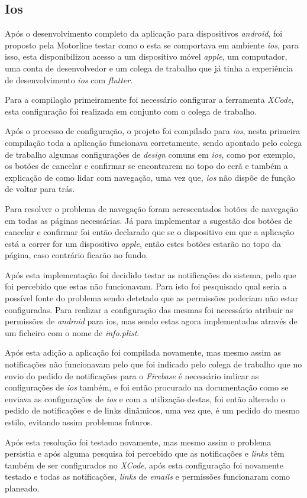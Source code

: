 \subsection{Ios}
Após o desenvolvimento completo da aplicação para dispositivos \textit{android}, foi proposto pela Motorline testar como o esta se comportava em ambiente \textit{ios}, para isso, esta disponibilizou acesso a um dispositivo móvel \textit{apple}, um computador, uma conta de desenvolvedor e um colega de trabalho que já tinha a experiência de desenvolvimento \textit{ios} com \textit{flutter}.

Para a compilação primeiramente foi necessário configurar a ferramenta \textit{XCode}, esta configuração foi realizada em conjunto com o colega de trabalho.

Após o processo de configuração, o projeto foi compilado para \textit{ios}, nesta primeira compilação toda a aplicação funcionava corretamente, sendo apontado pelo colega de trabalho algumas configurações de \textit{design} comuns em \textit{ios}, como por exemplo, os botões de cancelar e confirmar se encontrarem no topo do ecrã e também a explicação de como lidar com navegação, uma vez que, \textit{ios} não dispõe de função de voltar para trás.

Para resolver o problema de navegação foram acrescentados botões de navegação em todas as páginas necessárias. Já para implementar a sugestão dos botões de cancelar e confirmar foi então declarado que se o dispositivo em que a aplicação está a correr for um dispositivo \textit{apple}, então estes botões estarão no topo da página, caso contrário ficarão no fundo.

Após esta implementação foi decidido testar as notificações do sistema, pelo que foi percebido que estas não funcionavam. Para isto foi pesquisado qual seria a possível fonte do problema sendo detetado que as permissões poderiam não estar configuradas. Para realizar a configuração das mesmas foi necessário atribuir as permissões de \textit{android} para ios, mas sendo estas agora implementadas através de um ficheiro com o nome de \textit{info.plist}.

Após esta adição a aplicação foi compilada novamente, mas mesmo assim as notificações não funcionavam pelo que foi indicado pelo colega de trabalho que no envio do pedido de notificações para o \textit{Firebase} é necessário indicar as configurações de \textit{ios} também, e foi então procurado na documentação como se enviava as configurações de \textit{ios} e com a utilização destas, foi então alterado o pedido de notificações e de links dinâmicos, uma vez que, é um pedido do mesmo estilo, evitando assim problemas futuros.

Após esta resolução foi testado novamente, mas mesmo assim o problema persistia e após alguma pesquisa foi percebido que as notificações e \textit{links} têm também de ser configurados no \textit{XCode}, após esta configuração foi novamente testado e todas as notificações, \textit{links} de \textit{emails} e permissões funcionaram como planeado.